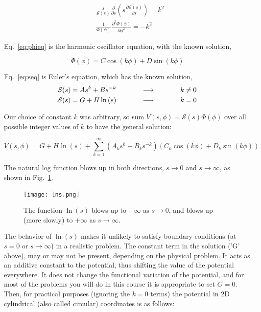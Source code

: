 \documentclass[12pt]{article}
\begin{document}
\begin{flushleft}
\begin{align}
& \frac{s}{\mathcal{S}(s)}\frac{\partial}{\partial s}\left( s \frac{\partial \mathcal{S}(s)}{\partial s} \right) = k^{2} \label{eq:seq} \\[6pt]
& \frac{1}{\Phi(\phi)} \frac{\partial^{2} \Phi(\phi)}{\partial \phi^{2}}  = -k^{2} \label{eq:phieq}
\end{align}

Eq.~\ref{eq:phieq} is the harmonic oscillator equation, with the known solution,

\[
\Phi(\phi) = C\cos{(k\phi)} + D\sin{(k\phi)}
\]

Eq.~\ref{eq:seq} is Euler's equation, which has the known solution,
\begin{align}
& \mathcal{S}(s) = As^{k} +Bs^{-k} \hspace{.5in} \longrightarrow \hspace{.5in}  k \ne 0 \\
& \mathcal{S}(s) = G + H\ln{(s)} \hspace{.5in} \longrightarrow \hspace{.5in}  k = 0
\end{align}

Our choice of constant $k$ was arbitrary, so sum $V(s,\phi) = \mathcal{S}(s)\Phi(\phi)$ over all possible integer values of $k$ to have the general solution:

\begin{equation}
V(s,\phi) = G + H\ln{(s)} + \sum_{k=1}^{\infty} \left(  A_{k}s^{k} + B_{k}s^{-k} \right) ( C_{k} \cos{(k\phi)}+D_{k}\sin{(k\phi)} )
\label{eq:withkzero}
\end{equation}

The natural log function blows up in both directions, $s\rightarrow 0$ and $s\rightarrow \infty$, as shown in Fig.~\ref{fig:lns}.

\begin{figure}[h]
\centering
\texttt{[image: lns.png]}
\caption{\small The function $\ln{(s)}$ blows up to $-\infty$ as $s\rightarrow 0$, and blows up (more slowly) to $+\infty$ as $s\rightarrow \infty$.}
\label{fig:lns}
\end{figure}

The behavior of $\ln{(s)}$ makes it unlikely to satisfy boundary conditions (at $s=0$ or $s\rightarrow \infty$) in a realistic problem.  The constant term in the solution ('G' above), may or may not be present, depending on the physical problem.  It acts as an additive constant to the potential, thus shifting the value of the potential everywhere.  It does not change the functional variation of the potential, and for most of the problems you will do in this course it is appropriate to set $G=0$.  Then, for practical purposes (ignoring the $k=0$ terms) the potential in 2D cylindrical (also called circular) coordinates is as follows:


\end{flushleft}
\end{document}
